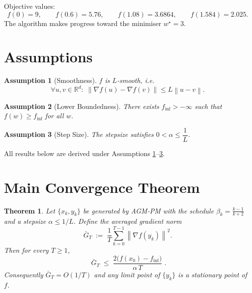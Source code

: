 \documentclass{article}
\newtheorem{theorem}{Theorem}
\newtheorem{assumption}{Assumption}
\newcommand{\norm}[1]{\left\lVert#1\right\rVert}
\newcommand{\grad}{\nabla}
\begin{document}
Objective values:
\[
f(0)=9,\qquad f(0.6)=5.76,\qquad f(1.08)=3.6864,\qquad f(1.584)=2.025.
\]
The algorithm makes progress toward the minimiser $w^{\star}=3$.

\newpage
\section*{Assumptions}
\begin{assumption}[Smoothness]\label{ass:smooth}
$f$ is $L$‑smooth, i.e.
\[
\forall u,v\in\mathbb{R}^{d}:\;
\norm{\grad f(u)-\grad f(v)}\le L\norm{u-v}.
\]
\end{assumption}
\begin{assumption}[Lower Boundedness]\label{ass:lower}
There exists $f_{\inf}>-\infty$ such that $f(w)\ge f_{\inf}$ for all $w$.
\end{assumption}
\begin{assumption}[Step Size]\label{ass:stepsize}
The stepsize satisfies $0<\alpha\le \dfrac{1}{L}$.
\end{assumption}
All results below are derived under Assumptions \ref{ass:smooth}–\ref{ass:stepsize}.

\section*{Main Convergence Theorem}
\begin{theorem}\label{thm:main}
Let $\{x_k,y_k\}$ be generated by AGM‑PM with the schedule $\beta_k=\frac{k-1}{k+2}$ and a stepsize $\alpha\le 1/L$.  
Define the averaged gradient norm
\[
\bar G_T \;:=\; \frac{1}{T}\sum_{k=0}^{T-1}\norm{\grad f(y_k)}^{2}.
\]
Then for every $T\ge 1$,
\[
\boxed{\;
\bar G_T\;\le\;
\frac{2\bigl(f(x_0)-f_{\inf}\bigr)}{\alpha\,T}\; }.
\]
Consequently $\bar G_T=O(1/T)$ and any limit point of $\{y_k\}$ is a stationary point of $f$.
\end{theorem}
\end{document}
